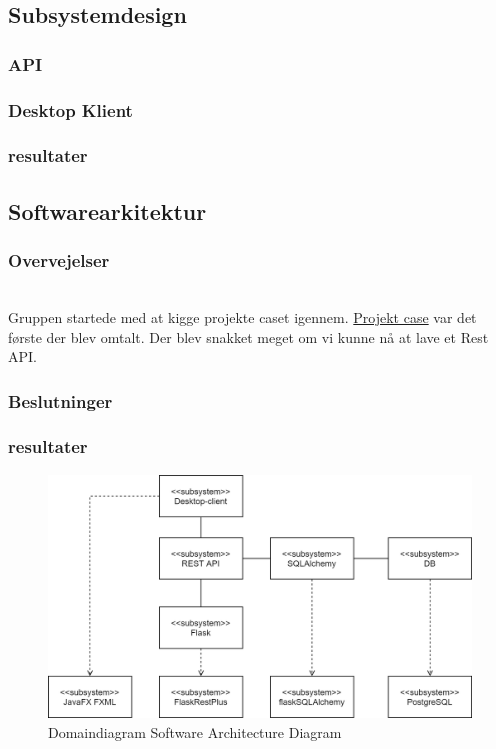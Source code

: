 \subsection{Subsystemdesign}
\subsubsection{API}
\subsubsection{Desktop Klient}
    
    

\subsubsection{resultater}
        
        
\subsection{Softwarearkitektur}        
\subsubsection{Overvejelser}
 \\
Gruppen startede med at kigge projekte caset igennem. \cite{TV2-case} \hyperlink{https://docs.google.com/document/d/1p6lQjWV76TX9uTLst2OAdmV07XfMRn5fObelzBpd2EI/edit}{Projekt case} var det første der blev omtalt. Der blev snakket meget om vi kunne nå at lave et Rest API.

\subsubsection{Beslutninger}
\subsubsection{resultater}

\begin{figure}[h]
    \centering
    \includegraphics[width=\textwidth]{figures/design/domaindiagram-Software Architecture Diagram.png}
    \caption{Domaindiagram Software Architecture Diagram}
    \label{fig:domaindiagram-software-diagram}
\end{figure}{}
